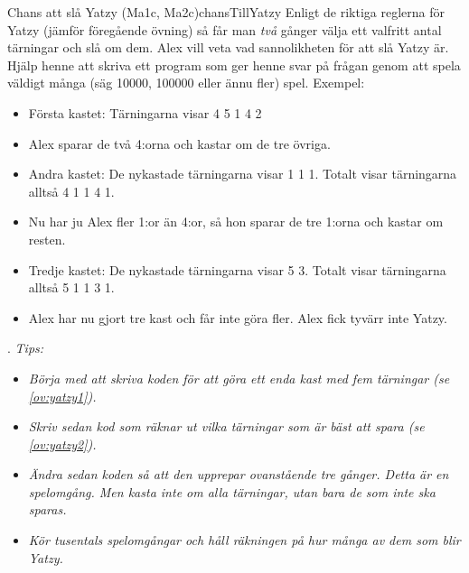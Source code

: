 \begin{matteovnings}{Chans att slå Yatzy (Ma1c, Ma2c)}{chansTillYatzy}
Enligt de riktiga reglerna för Yatzy (jämför föregående övning) så får man \emph{två} gånger välja ett valfritt antal tärningar och slå om dem. Alex vill veta vad sannolikheten för att slå Yatzy är. Hjälp henne att skriva ett program som ger henne svar på frågan genom att spela väldigt många (säg 10000, 100000 eller ännu fler) spel.
\newpage
Exempel:
\begin{itemize}
\item Första kastet: Tärningarna visar 4 5 1 4 2
\item Alex sparar de två 4:orna och kastar om de tre övriga.
\item Andra kastet: De nykastade tärningarna visar 1 1 1. Totalt visar tärningarna alltså 4 1 1 4 1.
\item Nu har ju Alex fler 1:or än 4:or, så hon sparar de tre 1:orna och kastar om resten.
\item Tredje kastet: De nykastade tärningarna visar 5 3. Totalt visar tärningarna alltså 5 1 1 3 1.
\item Alex har nu gjort tre kast och får inte göra fler. Alex fick tyvärr inte Yatzy.
\end{itemize}
{\color{white}.}
\newline
\emph{Tips:}
\begin{itemize}
\item \emph{Börja med att skriva koden för att göra ett enda kast med fem tärningar (se \autoref{ov:yatzy1}).}
\item \emph{Skriv sedan kod som räknar ut vilka tärningar som är bäst att spara (se \autoref{ov:yatzy2}).}
\item\emph{Ändra sedan koden så att den upprepar ovanstående tre gånger. Detta är en spelomgång. Men kasta inte om alla tärningar, utan bara de som inte ska sparas.}
\item\emph{Kör tusentals spelomgångar och håll räkningen på hur många av dem som blir Yatzy.}
\end{itemize}
\end{matteovnings}



